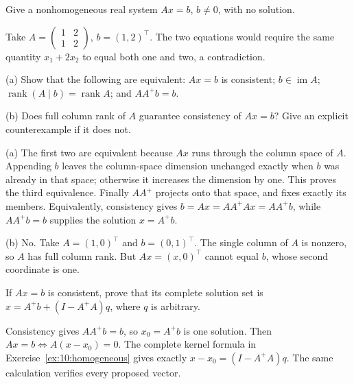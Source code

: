 \begin{problem}\label{ex:10:inconsistent}
Give a nonhomogeneous real system \(Ax=b\), \(b\ne0\), with no solution.
\end{problem}
\begin{solution}
Take \(A=\begin{pmatrix}1&2\\1&2\end{pmatrix}\),
\(b=(1,2)^\top\). The two equations would require the same quantity
\(x_1+2x_2\) to equal both one and two, a contradiction.
\end{solution}

\begin{problem}\label{ex:10:consistency}
(a) Show that the following are equivalent: \(Ax=b\) is consistent;
\(b\in\operatorname{im}A\); \(\operatorname{rank}(A\mid b)=\operatorname{rank}A\);
and \(AA^+b=b\).

(b) Does full column rank of \(A\) guarantee consistency of \(Ax=b\)?
Give an explicit counterexample if it does not.
\end{problem}
\begin{solution}
(a) The first two are equivalent because \(Ax\) runs through the column
space of \(A\). Appending \(b\) leaves the column-space dimension
unchanged exactly when \(b\) was already in that space; otherwise it
increases the dimension by one. This proves the third equivalence.
Finally \(AA^+\) projects onto that space, and fixes exactly its members.
Equivalently, consistency gives \(b=Ax=AA^+Ax=AA^+b\), while
\(AA^+b=b\) supplies the solution \(x=A^+b\).

(b) No. Take \(A=(1,0)^\top\) and \(b=(0,1)^\top\).
The single column of \(A\) is nonzero, so \(A\) has full column rank.
But \(Ax=(x,0)^\top\) cannot equal \(b\), whose second coordinate is one.
\end{solution}

\begin{problem}\label{ex:10:all-exact}
If \(Ax=b\) is consistent, prove that its complete solution set is
\(x=A^+b+(I-A^+A)q\), where \(q\) is arbitrary.
\end{problem}
\begin{solution}
Consistency gives \(AA^+b=b\), so \(x_0=A^+b\) is one solution.
Then \(Ax=b\iff A(x-x_0)=0\). The complete kernel formula in
Exercise~\ref{ex:10:homogeneous} gives exactly
\(x-x_0=(I-A^+A)q\). The same calculation verifies every proposed vector.
\end{solution}

